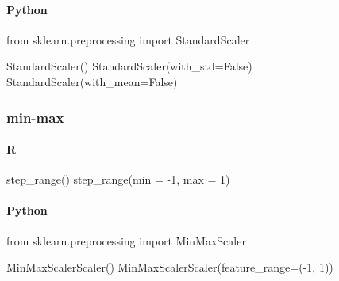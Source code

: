\documentclass[
  letterpaper,
  DIV=11,
  numbers=noendperiod]{scrreprt}
\newenvironment{Shaded}{\begin{snugshade}}{\end{snugshade}}
\newcommand{\AttributeTok}[1]{\textcolor[rgb]{0.40,0.46,0.14}{#1}}
\newcommand{\DecValTok}[1]{\textcolor[rgb]{0.68,0.00,0.00}{#1}}
\newcommand{\FunctionTok}[1]{\textcolor[rgb]{0.28,0.35,0.67}{#1}}
\newcommand{\ImportTok}[1]{\textcolor[rgb]{0.00,0.46,0.62}{#1}}
\newcommand{\NormalTok}[1]{\textcolor[rgb]{0.00,0.46,0.62}{#1}}
\newcommand{\OperatorTok}[1]{\textcolor[rgb]{0.37,0.37,0.37}{#1}}
\newcommand{\SpecialCharTok}[1]{\textcolor[rgb]{0.37,0.37,0.37}{#1}}
\newcommand{\VariableTok}[1]{\textcolor[rgb]{0.07,0.07,0.07}{#1}}
\let\oldparagraph\paragraph
\renewcommand{\paragraph}[1]{\oldparagraph{#1}\mbox{}}
\begin{document}
\hypertarget{python-62}{%
\paragraph{Python}\label{python-62}}

\begin{Shaded}
\begin{Highlighting}[]
\ImportTok{from}\NormalTok{ sklearn.preprocessing }\ImportTok{import}\NormalTok{ StandardScaler}

\NormalTok{StandardScaler()}
\NormalTok{StandardScaler(with\_std}\OperatorTok{=}\VariableTok{False}\NormalTok{)}
\NormalTok{StandardScaler(with\_mean}\OperatorTok{=}\VariableTok{False}\NormalTok{)}
\end{Highlighting}
\end{Shaded}

\hypertarget{min-max}{%
\subsubsection{min-max}\label{min-max}}

\hypertarget{r-63}{%
\paragraph{R}\label{r-63}}

\begin{Shaded}
\begin{Highlighting}[]
\FunctionTok{step\_range}\NormalTok{()}
\FunctionTok{step\_range}\NormalTok{(}\AttributeTok{min =} \SpecialCharTok{{-}}\DecValTok{1}\NormalTok{, }\AttributeTok{max =} \DecValTok{1}\NormalTok{)}
\end{Highlighting}
\end{Shaded}

\hypertarget{python-63}{%
\paragraph{Python}\label{python-63}}

\begin{Shaded}
\begin{Highlighting}[]
\ImportTok{from}\NormalTok{ sklearn.preprocessing }\ImportTok{import}\NormalTok{ MinMaxScaler}

\NormalTok{MinMaxScalerScaler()}
\NormalTok{MinMaxScalerScaler(feature\_range}\OperatorTok{=}\NormalTok{(}\OperatorTok{{-}}\DecValTok{1}\NormalTok{, }\DecValTok{1}\NormalTok{))}
\end{Highlighting}
\end{Shaded}
\end{document}
